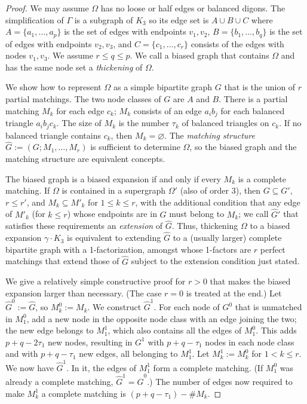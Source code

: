 \documentclass[reqno,12pt]{amsart}
\theoremstyle{remark}
\numberwithin{equation}{section}
\numberwithin{figure}{section}
\newcommand \eset{\emptyset}
\renewcommand \eset{\varnothing}
\begin{document}
\begin{proof}
We may assume $\Omega$ has no loose or half edges or balanced digons.  The simplification of $\Gamma$ is a subgraph of $K_3$ so its edge set is $A \cup B \cup C$ where $A=\{a_1,\ldots,a_p\}$ is the set of edges with endpoints  $v_1,v_2$, $B=\{b_1,\ldots,b_q\}$ is the set of edges with endpoints $v_2,v_3$, and $C=\{c_1,\ldots,c_r\}$ consists of the edges with nodes $v_1,v_3$.  We assume $r \leq q \leq p$.  We call a biased graph that contains $\Omega$ and has the same node set a \emph{thickening} of $\Omega$.

We show how to represent $\Omega$ as a simple bipartite graph $G$ that is the union of $r$ partial matchings.  The two node classes of $G$ are $A$ and $B$.  There is a partial matching $M_k$ for each edge $c_k$; $M_k$ consists of an edge $a_ib_j$ for each balanced triangle $a_ib_jc_k$.  The size of $M_k$ is the number $\tau_k$ of balanced triangles on $c_k$.  If no balanced triangle contains $c_k$, then $M_k=\eset$.  The \emph{matching structure} $\hat G:=(G;M_1,\ldots,M_r)$ is sufficient to determine $\Omega$, so the biased graph and the matching structure are equivalent concepts.  

The biased graph is a biased expansion if and only if every $M_k$ is a complete matching.  
If $\Omega$ is contained in a supergraph $\Omega'$ (also of order 3), then $G \subseteq G'$, $r \leq r'$, and $M_k \subseteq M'_k$ for $1\leq k \leq r$, with the additional condition that any edge of $M'_k$ (for $k\leq r$) whose endpoints are in $G$ must belong to $M_k$; we call $\hat G'$ that satisfies these requirements an \emph{extension} of $\hat G$.  
Thus, thickening $\Omega$ to a biased expansion $\gamma\cdot K_3$ is equivalent to extending $\hat G$ to a (usually larger) complete bipartite graph with a 1-factorization, amongst whose 1-factors are $r$ perfect matchings that extend those of $\hat G$ subject to the extension condition just stated.

We give a relatively simple constructive proof for $r>0$ that makes the biased expansion larger than necessary.  (The case $r=0$ is treated at the end.)  Let $\hat G^0:=\hat G$, so $M_k^0:=M_k$.  We construct $\hat G^1$.  For each node of $G^0$ that is unmatched in $M_1^0$, add a new node in the opposite node class with an edge joining the two; the new edge belongs to $M_1^1$, which also contains all the edges of $M_1^0$.  This adds $p+q-2\tau_1$ new nodes, resulting in $G^1$ with $p+q-\tau_1$ nodes in each node class and with $p+q-\tau_1$ new edges, all belonging to $M_1^1$.  Let $M_k^1:=M_k^0$ for $1 < k \leq r$.  We now have $\hat G^1$.  In it, the edges of $M_1^1$ form a complete matching.  (If $M_1^0$ was already a complete matching, $\hat G^1=\hat G^0$.)  The number of edges now required to make $M_k^1$ a complete matching is $(p+q-\tau_1)-\#M_k$.


\end{proof}
\end{document}
